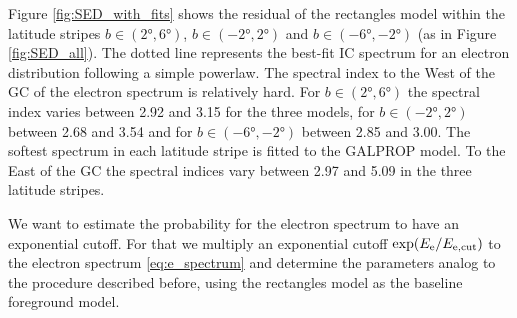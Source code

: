 Figure \ref{fig:SED_with_fits} shows the residual of the rectangles model within the latitude stripes $b \in (\ang{2}, \ang{6})$, $b \in (-\ang{2}, \ang{2})$ and $b \in (-\ang{6}, -\ang{2})$ (as in Figure \ref{fig:SED_all}). The dotted line represents the best-fit IC spectrum for an electron distribution following a simple powerlaw.
The spectral index to the West of the GC of the electron spectrum is relatively hard. For $b \in (\ang{2}, \ang{6})$ the spectral index varies between 2.92 and 3.15 for the three models, for $b \in (-\ang{2}, \ang{2})$ between 2.68 and 3.54 and for $b \in (-\ang{6}, -\ang{2})$ between 2.85 and 3.00. The softest spectrum in each latitude stripe is fitted to the GALPROP model. To the East of the GC the spectral indices vary between 2.97 and 5.09 in the three latitude stripes. 


We want to estimate the probability for the electron spectrum to have an exponential cutoff. For that we multiply an exponential cutoff $\exp(E_{\text{e}} / E_{\text{e},\text{cut}})$ to the electron spectrum \eqref{eq:e_spectrum} and determine the parameters analog to the procedure described before, using the rectangles model as the baseline foreground model.\\




